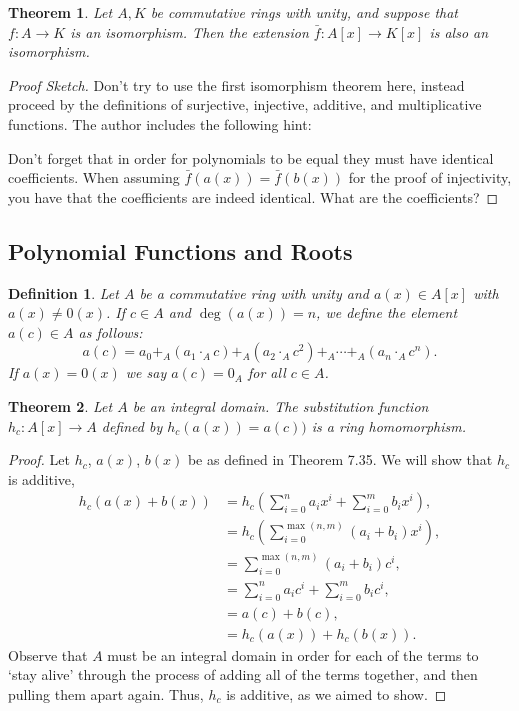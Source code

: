 \documentclass[letterpaper, 12pt]{article}
\newtheorem{defn}{Definition}
\newtheorem{thm}{Theorem}
\begin{document}
			\setcounter{thm}{29}
			\begin{thm}
			Let $A, K$ be commutative rings with unity, and suppose that $f:A \to K$ is an isomorphism.
			Then the extension $\bar{f} : A[x] \to K[x]$ is also an isomorphism.
			\end{thm}
			\color{blue}
			\begin{proof}[Proof Sketch]
			Don't try to use the first isomorphism theorem here, instead proceed by the definitions of surjective, injective, additive, and multiplicative functions.
			The author includes the following hint:

			Don't forget that in order for polynomials to be equal they must have identical coefficients.
			When assuming $\bar{f}(a(x)) = \bar{f}(b(x))$ for the proof of injectivity, you have that the coefficients are indeed identical.
			What are the coefficients?
			\end{proof}
			\color{black}

		\subsection{Polynomial Functions and Roots}
		\label{sub:polynomial_functions_and_roots}
			\setcounter{defn}{32}
			\begin{defn}
			Let $A$ be a commutative ring with unity and $a(x) \in A[x]$ with $a(x) \neq 0(x)$. 
			If $c \in A$ and $\deg(a(x)) = n$, we define the element $a(c) \in A$ as follows: $$a(c) = a_{0} +_{A} (a_{1} \cdot_{A} c) +_{A} (a_{2} \cdot_{A} c^{2}) +_{A} \cdots +_{A} (a_{n} \cdot_{A} c^{n}).$$
			If $a(x) = 0(x)$ we say $a(c) = 0_{A}$ for all $c \in A$.
			\end{defn}

			\setcounter{thm}{34}
			\begin{thm}
			Let $A$ be an integral domain. 
			The substitution function $h_{c}: A[x] \to A$ defined by $h_{c}(a(x)) = a(c))$ is a ring homomorphism.
			\end{thm}
			\color{blue}
			\begin{proof}
			Let $h_{c}$, $a(x)$, $b(x)$ be as defined in Theorem 7.35.
			We will show that $h_{c}$ is additive,
				\begin{align*}
				h_{c}(a(x) + b(x)) &= h_{c}\left( \sum\limits_{i=0}^{n} a_{i}x^{i} + \sum\limits_{i=0}^{m} b_{i}x^{i} \right), \\
				&= h_{c}\left( \sum\limits_{i=0}^{\max{(n,m)}} (a_{i} + b_{i})x^{i} \right), \\
				&= \sum\limits_{i=0}^{\max{(n,m)}} (a_{i} + b_{i})c^{i}, \\
				&= \sum\limits_{i=0}^{n} a_{i}c^{i} + \sum\limits_{i=0}^{m} b_{i}c^{i}, \\
				&= a(c) + b(c), \\
				&= h_{c}(a(x)) + h_{c}(b(x)).
				\end{align*}
			Observe that $A$ must be an integral domain in order for each of the terms to `stay alive' through the process of adding all of the terms together, and then pulling them apart again.
			Thus, $h_{c}$ is additive, as we aimed to show.	
			\end{proof}
			\color{black}
\end{document}
